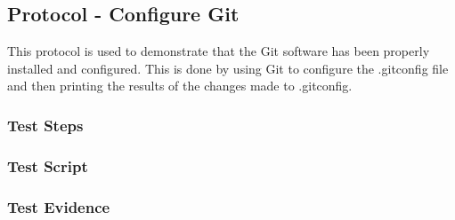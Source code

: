 \newpage
\subsection{Protocol - Configure Git}
This protocol is used to demonstrate that the Git software has been properly
installed and configured.  This is done by using Git to configure the .gitconfig
file and then printing the results of the changes made to .gitconfig.

\subsubsection{Test Steps}
      {}
      {}

\newpage
\subsubsection{Test Script}


\newpage
\subsubsection{Test Evidence}
      {}
      {}
